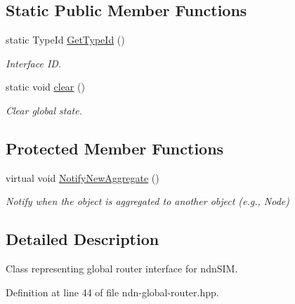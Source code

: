 \subsection*{Static Public Member Functions}
\begin{DoxyCompactItemize}
\item 
static Type\+Id \hyperlink{classns3_1_1ndn_1_1GlobalRouter_ab29773e613a1a1f3d4371e487dea6bba}{Get\+Type\+Id} ()
\begin{DoxyCompactList}\small\item\em Interface ID. \end{DoxyCompactList}\item 
static void \hyperlink{classns3_1_1ndn_1_1GlobalRouter_a67bc50e507dd80e85bfc6c85d902e9c9}{clear} ()\hypertarget{classns3_1_1ndn_1_1GlobalRouter_a67bc50e507dd80e85bfc6c85d902e9c9}{}\label{classns3_1_1ndn_1_1GlobalRouter_a67bc50e507dd80e85bfc6c85d902e9c9}

\begin{DoxyCompactList}\small\item\em Clear global state. \end{DoxyCompactList}\end{DoxyCompactItemize}
\subsection*{Protected Member Functions}
\begin{DoxyCompactItemize}
\item 
virtual void \hyperlink{classns3_1_1ndn_1_1GlobalRouter_adb21938458efac48e06d37e7dfcee946}{Notify\+New\+Aggregate} ()\hypertarget{classns3_1_1ndn_1_1GlobalRouter_adb21938458efac48e06d37e7dfcee946}{}\label{classns3_1_1ndn_1_1GlobalRouter_adb21938458efac48e06d37e7dfcee946}

\begin{DoxyCompactList}\small\item\em Notify when the object is aggregated to another object (e.\+g., Node) \end{DoxyCompactList}\end{DoxyCompactItemize}


\subsection{Detailed Description}
Class representing global router interface for ndn\+S\+IM. 

Definition at line 44 of file ndn-\/global-\/router.\+hpp.



